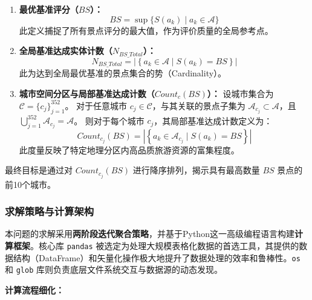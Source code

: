 \begin{enumerate}
    \item \textbf{最优基准评分（$BS$）：}
    \begin{equation}
    BS = \sup \{S(a_k) \mid a_k \in \mathcal{A}\}
    \end{equation}
    此定义捕捉了所有景点评分的最大值，作为评价质量的全局参考点。

    \item \textbf{全局基准达成实体计数（$N_{BS\_Total}$）：}
    \begin{equation}
    N_{BS\_Total} = |\left\{a_k \in \mathcal{A} \mid S(a_k) = BS\right\}|
    \end{equation}
    此为达到全局最优基准的景点集合的势（Cardinality）。

    \item \textbf{城市空间分区与局部基准达成计数（$Count_{c}(BS)$）：}
    设城市集合为 $\mathcal{C} = \{c_j\}_{j=1}^{352}$。
    对于任意城市 $c_j \in \mathcal{C}$，与其关联的景点子集为 $\mathcal{A}_{c_j} \subset \mathcal{A}$，且 $\bigcup_{j=1}^{352} \mathcal{A}_{c_j} = \mathcal{A}$。
    则对于每个城市 $c_j$，其局部基准达成计数定义为：
    \begin{equation}
    Count_{c_j}(BS) = |\left\{a_k \in \mathcal{A}_{c_j} \mid S(a_k) = BS\right\}|
    \end{equation}
    此度量反映了特定地理分区内高品质旅游资源的富集程度。
\end{enumerate}

最终目标是通过对 $Count_{c_j}(BS)$ 进行降序排列，揭示具有最高数量 $BS$ 景点的前10个城市。

\subsubsection{求解策略与计算架构}

本问题的求解采用\textbf{两阶段迭代聚合策略}，并基于Python这一高级编程语言构建\textbf{计算框架}。核心库 \texttt{pandas} 被选定为处理大规模表格化数据的首选工具，其提供的数据结构（DataFrame）和矢量化操作极大地提升了数据处理的效率和鲁棒性。\texttt{os} 和 \texttt{glob} 库则负责底层文件系统交互与数据源的动态发现。

\textbf{计算流程细化：}

